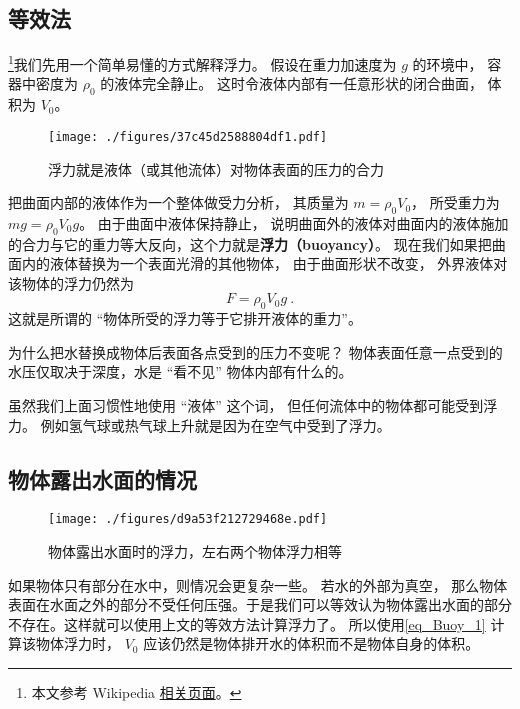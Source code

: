 

\subsection{等效法}

\footnote{本文参考 Wikipedia \href{https://en.wikipedia.org/wiki/Archimedes'_principle}{相关页面}。}我们先用一个简单易懂的方式解释浮力。 假设在重力加速度为 $g$ 的环境中， 容器中密度为 $\rho_0$ 的液体完全静止。 这时令液体内部有一任意形状的闭合曲面， 体积为 $V_0$。
\begin{figure}[ht]
\centering
\texttt{[image: ./figures/37c45d2588804df1.pdf]}
\caption{浮力就是液体（或其他流体）对物体表面的压力的合力} \label{fig_Buoy_1}
\end{figure}
把曲面内部的液体作为一个整体做受力分析， 其质量为 $m = \rho_0 V_0$， 所受重力为 $mg = \rho_0 V_0 g$。 由于曲面中液体保持静止， 说明曲面外的液体对曲面内的液体施加的合力与它的重力等大反向，这个力就是\textbf{浮力（buoyancy）}。 现在我们如果把曲面内的液体替换为一个表面光滑的其他物体， 由于曲面形状不改变， 外界液体对该物体的浮力仍然为
\begin{equation}\label{eq_Buoy_1}
F = \rho_0 V_0 g~.
\end{equation}
这就是所谓的 “物体所受的浮力等于它排开液体的重力”。

为什么把水替换成物体后表面各点受到的压力不变呢？ 物体表面任意一点受到的水压仅取决于深度，水是 “看不见” 物体内部有什么的。

虽然我们上面习惯性地使用 “液体” 这个词， 但任何流体中的物体都可能受到浮力。 例如氢气球或热气球上升就是因为在空气中受到了浮力。

\subsection{物体露出水面的情况}
\begin{figure}[ht]
\centering
\texttt{[image: ./figures/d9a53f212729468e.pdf]}
\caption{物体露出水面时的浮力，左右两个物体浮力相等} \label{fig_Buoy_2}
\end{figure}
如果物体只有部分在水中，则情况会更复杂一些。 若水的外部为真空， 那么物体表面在水面之外的部分不受任何压强。于是我们可以等效认为物体露出水面的部分不存在。这样就可以使用上文的等效方法计算浮力了。 所以使用\autoref{eq_Buoy_1} 计算该物体浮力时， $V_0$ 应该仍然是物体排开水的体积而不是物体自身的体积。


